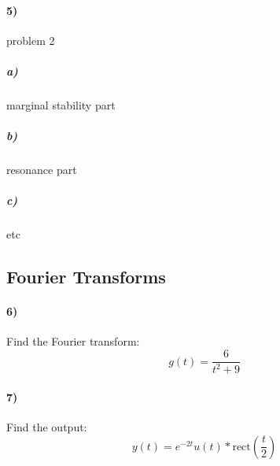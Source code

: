 \documentclass{article}
\begin{document}
\vfill

\paragraph{5)} problem 2

\subparagraph{a)} marginal stability part

\subparagraph{b)} resonance part

\subparagraph{c)} etc

\vfill

\newpage

\subsection*{Fourier Transforms}

\paragraph{6)} Find the Fourier transform: $$g(t)=\frac{6}{t^2+9}$$

\vfill

\paragraph{7)} Find the output: $$y(t)=e^{-2t}u(t)\ast \mathrm{rect}(\frac{t}{2})$$

\vfill
\end{document}
